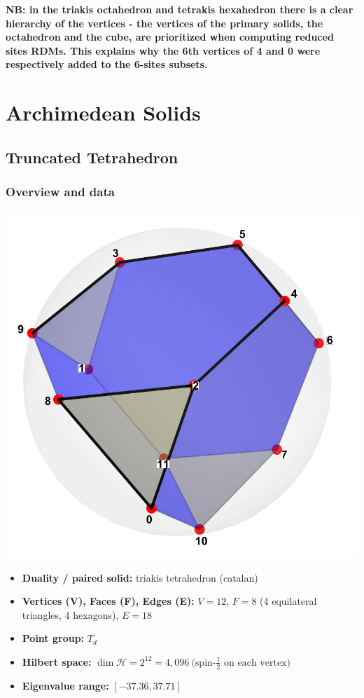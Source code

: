 \documentclass[11pt,a4paper]{article}
\begin{document}

\noindent\textbf{NB: in the triakis octahedron and tetrakis hexahedron there is a clear hierarchy of the vertices - the vertices of the primary solids, the octahedron and the cube, are prioritized when computing reduced sites RDMs. This explains why the 6th vertices of 4 and 0 were respectively added to the 6-sites subsets.}

\section*{Archimedean Solids}

\subsection*{Truncated Tetrahedron}

\subsubsection*{Overview and data}
\begin{center}
  \includegraphics[width=.6\linewidth]{truncatedtetrahedron}
\end{center}

\begin{itemize}[leftmargin=1.5em]
  \item \textbf{Duality / paired solid:} triakis tetrahedron (catalan)
  \item \textbf{Vertices (V), Faces (F), Edges (E):} $V = 12$,\; $F = 8$ (4 equilateral triangles, 4 hexagons),\; $E = 18$
  \item \textbf{Point group:} $T_d$
  \item \textbf{Hilbert space:} \(
        \dim\mathcal{H} = 2^{12} = 4,096\ \text{(spin-$\tfrac12$ on each vertex)}
        \)
  \item \textbf{Eigenvalue range:} $[-37.36, 37.71]$
\end{itemize}
\end{document}
